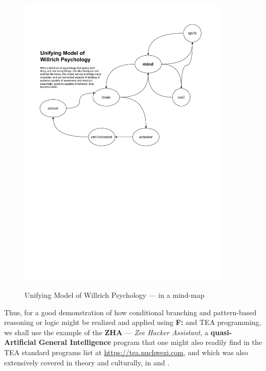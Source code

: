 \documentclass[a4paper, 18pt]{book} %
\begin{document}
\begin{figure}[H]
  \begin{center}
   \includegraphics[trim=0cm 12cm 0cm 0cm, clip, width=0.9\textwidth,]{resources/pdfs/all_willrich_psychology.pdf}\\
   \caption{Unifying Model of Willrich Psychology --- in a mind-map}
  \label{FIGWILLPSY}
  \end{center}
\end{figure}

  Thus, for a good demonstration of how conditional branching and pattern-based reasoning or logic might be realized and applied using \textbf{F:} and TEA programming, we shall use the example of the \textbf{ZHA} --- \textit{Zee Hacker Assistant}, a \textbf{quasi-Artificial General Intelligence} program that one might also readily find in the TEA standard programs list at \url{https://tea.nuchwezi.com}, and which was also extensively covered in theory and culturally, in \cite{jwlzha} and \cite{lutalo2025unraveling}.
\end{document}
